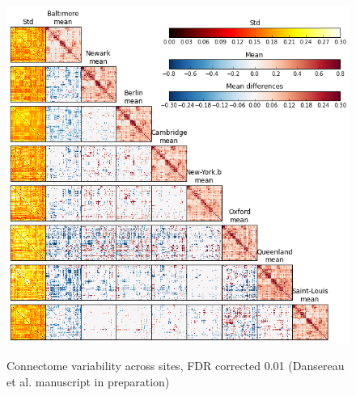\documentclass[authoryear]{elsarticle}
\begin{document}
\begin{figure}[H]
\begin{center}
\includegraphics[width=0.65\linewidth]{../figures/connectome_multisite.png}
\end{center}
\tiny{Connectome variability across sites, FDR corrected 0.01 (Dansereau et al. manuscript in preparation)
}
\end{figure}






\end{document}
